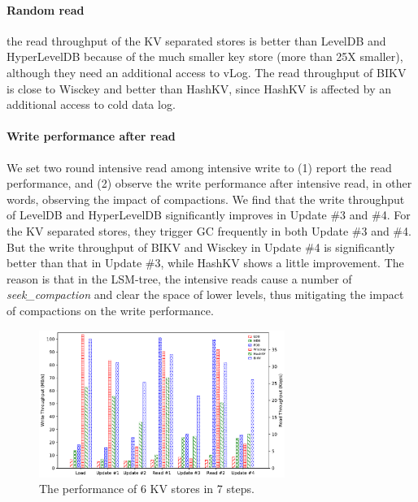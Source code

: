 \documentclass[sigconf]{acmart}
\begin{document}
\paragraph*{Random read} 
{\color{red}{corresponds to which phase?}}
{\color{red}{The experimental results of the two rounds random read both illustrate that}} the read throughput of the KV separated stores is better than LevelDB and HyperLevelDB because of the much smaller key store (more than 25X smaller), although they need an additional access to vLog. The read throughput of BIKV is close to Wisckey and better than HashKV, since HashKV is affected by an additional access to cold data log. {\color{red}{The read throughput of KVell is the best one, benefiting from the in-memory B tree index.}}

\paragraph*{Write performance after read}
We set two round intensive read among intensive write to (1) report the read performance, and (2) observe the write performance after intensive read, in other words, observing the impact of compactions. We find that the write throughput of LevelDB and HyperLevelDB significantly improves in Update \#3 and \#4. For the KV separated stores, they trigger GC frequently in both Update \#3 and \#4. But the write throughput of BIKV and Wisckey in Update \#4 is significantly better than that in Update \#3, while HashKV shows a little improvement. The reason is that in the LSM-tree, the intensive reads cause a number of \textit{seek\_compaction} and clear the space of lower levels, thus mitigating the impact of compactions on the write performance. {\color{red}{Because of the in-memory B tree index and the GC strategy, for KVell, batch read operations have no impact on subsequent write operations, thus the write throughput keeps stable.}}

\begin{figure}[!t]
	\setlength{\abovecaptionskip}{0.cm}	
	\setlength{\belowcaptionskip}{-0.cm}
	\centering
	\includegraphics[width=80mm]{total_performance.pdf}
	\caption{The performance of 6 KV stores in 7 steps.}
	\label{fig:pc}
\end{figure}
\end{document}
